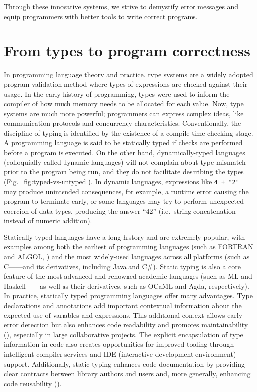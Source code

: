 Through these innovative systems, we strive to demystify error messages and equip programmers with better tools to write correct programs. 

\section{From types to program correctness}

In programming language theory and practice, type systems are a widely adopted program validation method where types of expressions are checked against their usage. In the early history of programming, types were used to inform the compiler of how much memory needs to be allocated for each value. Now, type systems are much more powerful; programmers can express complex ideas, like communication protocols and concurrency characteristics. Conventionally, the discipline of typing is identified by the existence of a compile-time checking stage. A programming language is said to be statically typed if checks are performed before a program is executed.  On the other hand, dynamically-typed languages (colloquially called dynamic languages) will not complain about type mismatch prior to the program being run, and they do not facilitate describing the types (Fig.\ \ref{fig:typed-vs-untyped}). In dynamic languages, expressions like \texttt{4 + "2"} may produce unintended consequences, for example, a runtime error causing the program to terminate early, or some languages may try to perform unexpected coercion of data types, producing the answer ``42'' (i.e.\ string concatenation instead of numeric addition). 

Statically-typed languages have a long history and are extremely popular, with examples among both the earliest of programming languages (such as FORTRAN and ALGOL, \cite{Backus1978-xt}) and the most widely-used languages across all platforms  (such as C---\cite{Ritchie1978-pa}---and its derivatives, including Java and C\#). Static typing is also a core feature of the most advanced and renowned academic languages (such as ML and Haskell---\cite{Hudak2007-kn}---as well as their derivatives, such as OCaML and Agda, respectively). In practice, statically typed programming languages offer many advantages. Type declarations and annotations add important contextual information about the expected use of variables and expressions. This additional context allows early error detection but also enhances code readability and promotes maintainability (\cite{Kleinschmager2012-bg}), especially in large collaborative projects. The explicit encapsulation of type information in code also creates opportunities for improved tooling through intelligent compiler services and IDE (interactive development environment) support. Additionally, static typing enhances code documentation by providing clear contracts between library authors and users and, more generally, enhancing code reusability (\cite{Endrikat2014-uz}).


